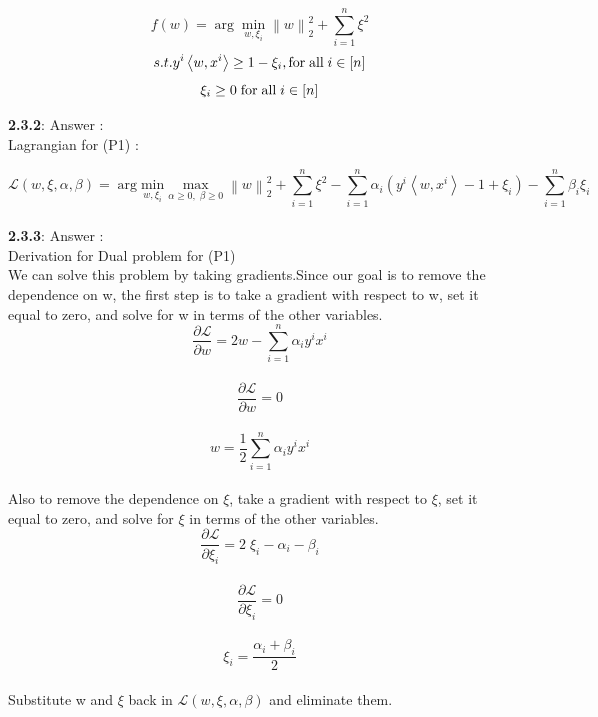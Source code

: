 \documentclass[a4paper,11pt]{article}
\begin{document}
\begin{mlsolution}

\[
f(w) = \arg \underset{w, {\xi_{i} }}{\min} \left \| w \right \|_{2}^{2} + \sum_{i = 1}^{n} \xi^{2}
\]\[
\\
s.t. y^{i} \left \langle w, x^{i} \right \rangle \geq 1 - \xi_{i}, \text{for} \; \text{all} \; i \in [n]
\]\[\\
\xi_{i} \geq 0\; \text{for} \; \text{all} \; i \in [n]
\]

\textbf{2.3.2}: Answer :\\

Lagrangian for (P1) :

\[
\mathcal{L}(w, \xi, \alpha, \beta) = \arg \underset{w, {\xi_{i} }}{ \text{min} } \; \underset{\alpha\geq 0 ,\; \beta\geq0}{\text{max}} \; \left \| w \right \|_{2}^{2} + \sum_{i = 1}^{n} \xi^{2}
 - \sum_{i=1}^{n} \alpha_{i} \left ( y^{i} \left \langle w, x^{i} \right \rangle - 1 + \xi_{i} \right ) - \sum_{i=1}^{n}\beta_{i} \xi_{i}
\]\\

\textbf{2.3.3}: Answer :\\

Derivation for Dual problem for (P1)\\

We can solve this problem by taking gradients.Since our goal is to remove the dependence on w, the first step is to take a gradient with respect to w, set it equal to zero, and solve for w in terms of the other variables.\\
\[
\frac{\partial  \mathcal{L}}{\partial w} = 2w - \sum_{i=1}^{n} \alpha_{i}y^{i}x^{i} 
\]\\\[
\frac{\partial  \mathcal{L}}{\partial w}  = 0
\]\\\[
w = \frac{1}{2}\sum_{i=1}^{n} \alpha_{i}y^{i}x^{i} 
\]\\

Also to remove the dependence on $\xi$, take a gradient with respect to $\xi$, set it equal to zero, and solve for $\xi$ in terms of the other variables.\\

\[
\frac{\partial  \mathcal{L}}{\partial \xi_{i} } = 2\;\xi_{i} - \alpha_{i} - \beta_{i}
\]\\\[
\frac{\partial  \mathcal{L}}{\partial \xi_{i} } = 0
\]\\\[
\xi_{i} = \frac{\alpha_{i} + \beta_{i}}{2}
\]\\

Substitute w and $\xi$ back in $\mathcal{L}(w, \xi, \alpha, \beta)$ and eliminate them.\\


\end{mlsolution}
\end{document}
